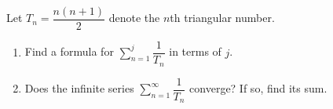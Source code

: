 Let $T_n=\dfrac{n(n+1)}{2}$ denote the $n$th triangular number.
\begin{enumerate}
\item[(a)] Find a formula for $\displaystyle\sum_{n=1}^{j}\dfrac{1}{T_n}$ in terms of $j$.
\item[(b)] Does the infinite series $\displaystyle\sum_{n=1}^{\infty}\dfrac{1}{T_n}$ converge? If so, find its sum.
\end{enumerate}
